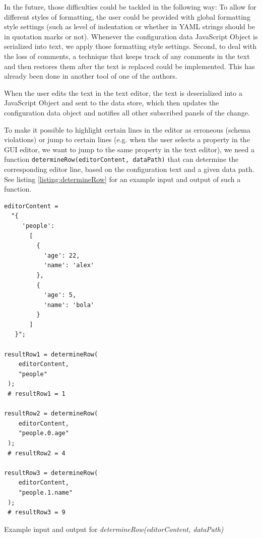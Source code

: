 In the future, those difficulties could be tackled in the following way: To allow for different styles of formatting, the user could be provided with global formatting style settings (such as level of indentation or whether in YAML strings should be in quotation marks or not). 
Whenever the configuration data JavaScript Object is serialized into text, we apply those formatting style settings.
Second, to deal with the loss of comments, a technique that keeps track of any comments in the text and then restores them after the text is replaced could be implemented. This has already been done in another tool of one of the authors\cite{githubBspEditor}.

When the user edits the text in the text editor, the text is deserialized into a JavaScript Object and sent to the data store, which then updates the configuration data object and notifies all other subscribed panels of the change.

To make it possible to highlight certain lines in the editor as erroneous (schema violations) or jump to certain lines (e.g. when the user selects a property in the GUI editor, we want to jump to the same property in the text editor), we need a function \texttt{determineRow(editorContent, dataPath)} that can determine the corresponding editor line, based on the configuration text and a given data path. See listing \ref{listing:determineRow} for an example input and output of such a function.

\begin{listing}[!h]
    \begin{verbatim}
editorContent =
  "{
     'people':
       [
         {
           'age': 22,
           'name': 'alex'
         },
         {
           'age': 5,
           'name': 'bola'
         }
       ]
   }";

resultRow1 = determineRow(
	editorContent,
	"people"
 );
 # resultRow1 = 1

resultRow2 = determineRow(
	editorContent,
	"people.0.age"
 );
 # resultRow2 = 4

resultRow3 = determineRow(
	editorContent,
	"people.1.name"
 );
 # resultRow3 = 9

    \end{verbatim}
    \caption{Example input and output for \textit{determineRow(editorContent, dataPath)}}
    \label{listing:determineRow}
\end{listing}

